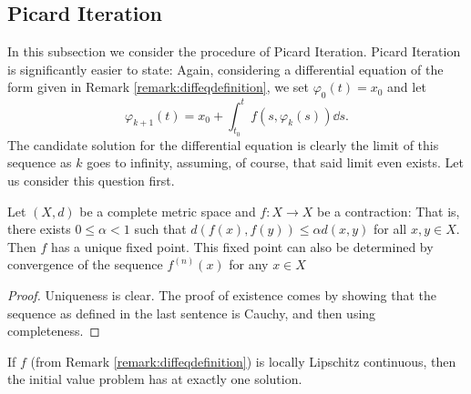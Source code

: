 \documentclass[prb,12pt]{revtex4-2}
\theoremstyle{definition}
\theoremstyle{definition}
\theoremstyle{definition}
\begin{document}
	\subsection{Picard Iteration}
	In this subsection we consider the procedure of Picard Iteration. Picard Iteration is significantly easier to state: Again, considering a differential equation of the form given in Remark \ref{remark:diffeqdefinition}, we set $\varphi_0(t)=x_0$ and let
	\[\varphi_{k+1}(t) = x_0+\int_{t_0}^{t} f(s, \varphi_k(s))\dd{s}.\]
	The candidate solution for the differential equation is clearly the limit of this sequence as $k$ goes to infinity, assuming, of course, that said limit even exists. Let us consider this question first.
	\begin{Theorem}
		Let $(X, d)$ be a complete metric space and $f:X\to X$ be a contraction: That is, there exists $0\le\alpha<1$ such that $d(f(x), f(y))\le \alpha d(x,y)$ for all $x,y\in X$. Then $f$ has a unique fixed point. This fixed point can also be determined by convergence of the sequence $f^{(n)}(x)$ for any $x\in X$
	\end{Theorem}
	\begin{proof}
		Uniqueness is clear. The proof of existence comes by showing that the sequence as defined in the last sentence is Cauchy, and then using completeness.
	\end{proof}
	\begin{Theorem}
		If $f$ (from Remark \ref{remark:diffeqdefinition}) is locally Lipschitz continuous, then the initial value problem has at exactly one solution.
	\end{Theorem}
\end{document}
